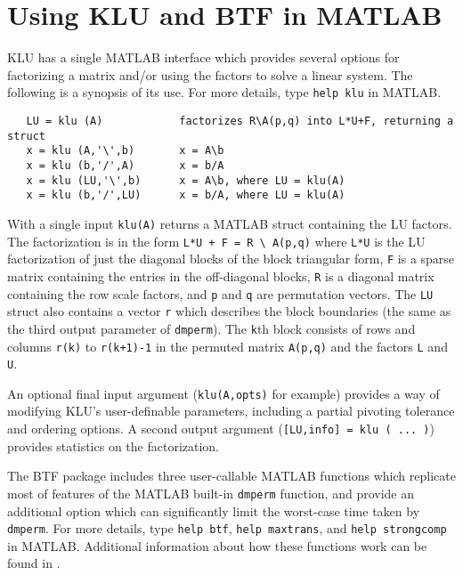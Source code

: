 \documentclass[11pt]{article}
\begin{document}
\section{Using KLU and BTF in MATLAB}

KLU has a single MATLAB interface which provides several options for factorizing
a matrix and/or using the factors to solve a linear system.  The following is
a synopsis of its use.  For more details, type {\tt help klu} in MATLAB.

{\footnotesize
\begin{verbatim}
   LU = klu (A)            factorizes R\A(p,q) into L*U+F, returning a struct
   x = klu (A,'\',b)       x = A\b
   x = klu (b,'/',A)       x = b/A
   x = klu (LU,'\',b)      x = A\b, where LU = klu(A)
   x = klu (b,'/',LU)      x = b/A, where LU = klu(A)
\end{verbatim}
}

With a single input {\tt klu(A)} returns a MATLAB struct containing the LU
factors.  The factorization is in the form \verb'L*U + F = R \ A(p,q)'
where {\tt L*U} is the LU factorization of just the diagonal blocks of the
block triangular form, {\tt F} is a sparse matrix containing the entries in
the off-diagonal blocks, {\tt R} is a diagonal matrix containing the row
scale factors, and {\tt p} and {\tt q} are permutation vectors.  The {\tt LU}
struct also contains a vector {\tt r} which describes the block boundaries
(the same as the third output parameter of {\tt dmperm}).  The {\tt k}th
block consists of rows and columns {\tt r(k)} to {\tt r(k+1)-1} in the
permuted matrix {\tt A(p,q)} and the factors {\tt L} and {\tt U}.

An optional final input argument ({\tt klu(A,opts)} for example) provides a
way of modifying KLU's user-definable parameters, including a partial pivoting
tolerance and ordering options.  A second output argument
({\tt [LU,info] = klu ( ... )}) provides statistics on the factorization.

The BTF package includes three user-callable MATLAB functions which replicate
most of features of the MATLAB built-in {\tt dmperm} function, and provide an
additional option which can significantly limit the worst-case time taken by
{\tt dmperm}.  For more details, type {\tt help btf}, {\tt help maxtrans},
and {\tt help strongcomp} in MATLAB.  Additional information about how
these functions work can be found in \cite{Davis06book}.
\end{document}
